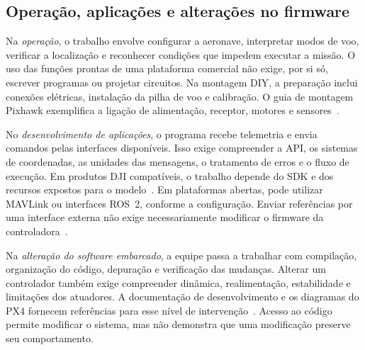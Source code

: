 \documentclass[11pt,a4paper,oneside]{book}
\numberwithin{equation}{chapter}
\begin{document}
\subsection{Operação, aplicações e alterações no firmware}
Na \emph{operação}, o trabalho envolve configurar a aeronave, interpretar modos de voo, verificar a localização e reconhecer condições que impedem executar a missão. O uso das funções prontas de uma plataforma comercial não exige, por si só, escrever programas ou projetar circuitos. Na montagem DIY, a preparação inclui conexões elétricas, instalação da pilha de voo e calibração. O guia de montagem Pixhawk exemplifica a ligação de alimentação, receptor, motores e sensores~\cite{px4montagem}.

No \emph{desenvolvimento de aplicações}, o programa recebe telemetria e envia comandos pelas interfaces disponíveis. Isso exige compreender a API, os sistemas de coordenadas, as unidades das mensagens, o tratamento de erros e o fluxo de execução. Em produtos DJI compatíveis, o trabalho depende do SDK e dos recursos expostos para o modelo~\cite{dji,djimobilesdk}. Em plataformas abertas, pode utilizar MAVLink ou interfaces ROS~2, conforme a configuração. Enviar referências por uma interface externa não exige necessariamente modificar o firmware da controladora~\cite{offboard}.

Na \emph{alteração do software embarcado}, a equipe passa a trabalhar com compilação, organização do código, depuração e verificação das mudanças. Alterar um controlador também exige compreender dinâmica, realimentação, estabilidade e limitações dos atuadores. A documentação de desenvolvimento e os diagramas do PX4 fornecem referências para esse nível de intervenção~\cite{px4desenvolvimento,controle}. Acesso ao código permite modificar o sistema, mas não demonstra que uma modificação preserve seu comportamento.
\end{document}
